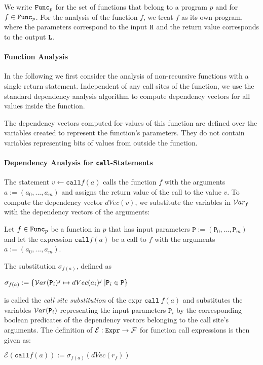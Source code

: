 We write $\mathtt{Func}_p$ for the set of functions that belong to a program $p$ and for $f \in \mathtt{Func}_p$. For the analysis of the function $f$, we treat $f$ as its own program, where the parameters correspond to the input $\mathtt{H}$ and the return value corresponds to the output $\mathtt{L}$.

\paragraph{Function Analysis}
In the following we first consider the analysis of non-recursive functions with a single return statement. Independent of any call sites of the function, we use the standard dependency analysis algorithm to compute dependency vectors for all values inside the function.

The dependency vectors computed for values of this function are defined over the variables created to represent the function's parameters. They do not contain variables representing bits of values from outside the function.

\paragraph{Dependency Analysis for \texttt{call}-Statements}
The statement $v \leftarrow \mathtt{call} f(a)$ calls the function $f$ with the arguments $a := (a_0,..., a_m)$ and assigns the return value of the call to the value $v$. To compute the dependency vector $dVec(v)$, we substitute the variables in $\mathcal{V}ar_f$ with the dependency vectors of the arguments:

\begin{definition}\label{def:callsiteSub}
    Let $f \in \mathtt{Func}_p$ be a function in $p$ that has input parameters $\mathtt{P} := (\mathtt{P}_0,...,\mathtt{P}_m)$ and let the expression $\mathtt{call} f(a)$ be a call to $f$ with the arguments $a := (a_0,..., a_m)$.
    
    The substitution $\sigma_{f(a)}$, defined as
    \begin{center}
        $\sigma_{f(a)} := \{ \mathcal{V}ar(\mathtt{P}_i)^j \mapsto dVec(a_i)^j \: |  \mathtt{P}_i \in \mathtt{P}\}$
    \end{center}
    is called the \emph{call site substitution} of the expr $\mathtt{call} \: f(a)$ and substitutes the variables $\mathcal{V}ar(\mathtt{P}_i)$ representing the input parameters $\mathtt{P}_i$ by the corresponding boolean predicates of the dependency vectors belonging to the call site's arguments.
    The definition of $\mathcal{E}: \mathtt{Expr} \to \mathcal{F}$ for function call expressions is then given as:
    \begin{center}
        $\mathcal{E}(\mathtt{call} f(a)) := \sigma_{f(a)} (dVec(r_f))$
    \end{center}
\end{definition}

